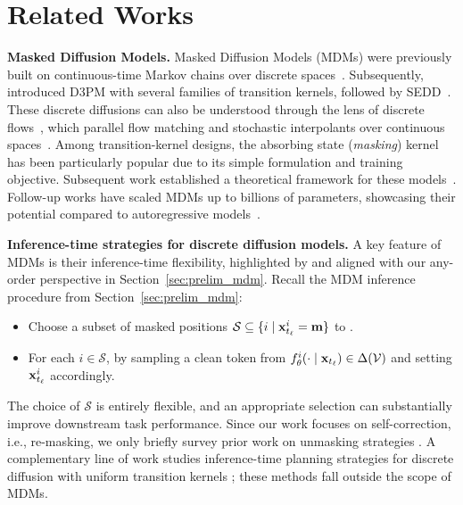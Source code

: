 \newpage
\section{Related Works} \label{appendix:prior_work}
\textbf{Masked Diffusion Models.}
Masked Diffusion Models (MDMs) were previously built on continuous-time Markov chains over discrete spaces~\citep{hoogeboom2021argmax}. Subsequently, \citet{austin2021structured} introduced D3PM with several families of transition kernels, followed by SEDD~\citep{lou2023discrete}. These discrete diffusions can also be understood through the lens of discrete flows~\citep{campbell2024generative,gat2024discrete}, which parallel flow matching and stochastic interpolants over continuous spaces~\citep{albergo2022building,albergo2023stochastic,lipman2022flow}. Among transition-kernel designs, the absorbing state (\emph{masking}) kernel has been particularly popular due to its simple formulation and training objective. Subsequent work established a theoretical framework for these models~\citep{zheng2023reparameterized,sahoo2024simple,zheng2024masked}. Follow-up works have scaled MDMs up to billions of parameters, showcasing their potential compared to autoregressive models~\citep{nie2025large,dream2025,gemini2025diffusion,labs2025mercury,gong2025diffucoder}.

\textbf{Inference-time strategies for discrete diffusion models.}
A key feature of MDMs is their inference-time flexibility, highlighted by \citet{zheng2024masked,ou2024your} and aligned with our any-order perspective in Section~\ref{sec:prelim_mdm}. Recall the MDM inference procedure from Section~\ref{sec:prelim_mdm}:
\begin{itemize}[leftmargin=15pt,itemsep=0pt,topsep=-0.25em]
\item[(a)] Choose a subset of masked positions $\mathcal{S}\subseteq\{i\mid {\mathbf{x}}_{t_\ell}^i=\mathbf{m}\}$ to .
\item[(b)] For each $i\in\mathcal{S}$,  by sampling a clean token from $f_\theta^i(\cdot\mid {\mathbf{x}}_{t_\ell})\in\Delta(\mathcal{V})$ and setting ${\mathbf{x}}_{t_\ell}^i$ accordingly.
\end{itemize}
The choice of $\mathcal{S}$ is entirely flexible, and an appropriate selection can substantially improve downstream task performance. Since our work focuses on self-correction, i.e., re-masking, we only briefly survey prior work on unmasking strategies \citep{kim2025train,peng2025pathplanningmaskeddiffusion,chang2022maskgit,ben2025accelerated,rout2025anchored}. A complementary line of work studies inference-time planning strategies for discrete diffusion with uniform transition kernels \citep{liu2024think,varma2024glauber}; these methods fall outside the scope of MDMs.

